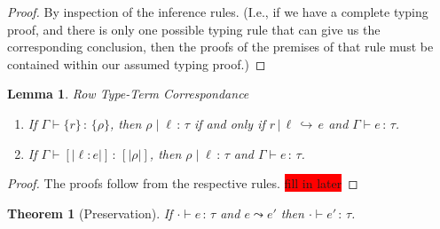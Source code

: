 \documentclass{article}
\newcommand{\todo}[1]{\colorbox{red}{#1}}
\newtheorem{theorem}{Theorem}
\newtheorem{lemma}{Lemma}
\newcommand{\variant}[1]{[\!|#1|\!]}
\newcommand{\hastp}[3]{#1 \vdash #2 \,:\, #3}
\newcommand{\haslbl}[3]{#1\;|\;#2\,:\, #3}
\newcommand{\haslbltm}[3]{#1\,|\,#2\,\hookrightarrow\, #3}
\newcommand{\step}[2]{#1 \leadsto #2}
\begin{document}
\begin{proof}
By inspection of the inference rules. (I.e., if we have a complete typing proof,
and there is only one possible typing rule that can give us the corresponding conclusion,
then the proofs of the premises of that rule must be contained within our assumed typing proof.)
\end{proof}

\begin{lemma}{Row Type-Term Correspondance} \label{lem:row-type-term}
  \mbox{}
  \begin{enumerate}
  \item If \(\hastp \Gamma {\{r\}} {\{\rho\}}\), then \(\haslbl \rho \ell \tau\)
    if and only if \(\haslbltm r \ell e\) and \(\hastp \Gamma e \tau\).
  \item If \(\hastp \Gamma {\variant {\ell : e}} {\variant \rho}\), then
    \(\haslbl \rho \ell \tau\) and \(\hastp \Gamma e \tau\).
  \end{enumerate}
\end{lemma}

\begin{proof}
  The proofs follow from the respective rules. \todo{fill in later}
\end{proof}

\begin{theorem}[Preservation]
If $\hastp{\cdot}{e}{\tau}$ and $\step{e}{e'}$ then $\hastp{\cdot}{e'}{\tau}$.
\end{theorem}
\end{document}
